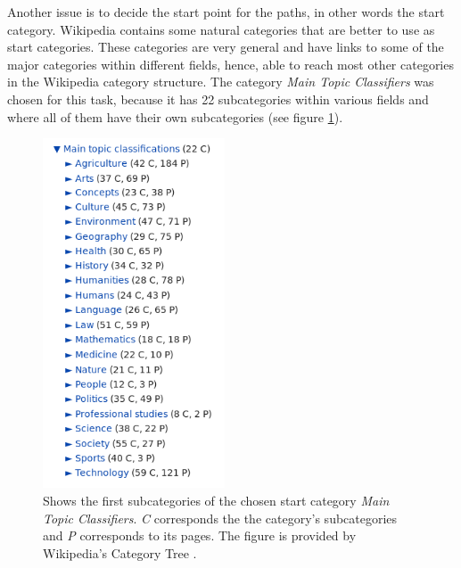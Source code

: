 Another issue is to decide the start point for the paths, in other words the start category. Wikipedia contains some natural categories that are better to use as start categories. These categories are very general and have links to some of the major categories within different fields, hence, able to reach most other categories in the Wikipedia category structure. The category \emph{Main Topic Classifiers} was chosen for this task, because it has 22 subcategories within various fields and  where all of them have their own subcategories (see figure \ref{fig:mainclassifiers})\cite{wiki:specialtree}.

\begin{figure}[h]
\begin{center}
\includegraphics[width=0.48\textwidth]{Chapters/Implementation/Maintopicclassifiers.png}
\end{center}
\caption[Subcategories of \emph{Main Topic Classifiers}]{Shows the first subcategories of the chosen start category \emph{Main Topic Classifiers}. \emph{C} corresponds the the category's subcategories and \emph{P} corresponds to its pages. The figure is provided by Wikipedia's Category Tree \cite{wiki:specialtree}.}
\vspace{-20pt}
\label{fig:mainclassifiers}
\end{figure}


